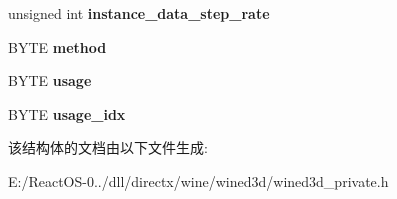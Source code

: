 \begin{DoxyCompactItemize}
unsigned int {\bfseries instance\+\_\+data\+\_\+step\+\_\+rate}
\item 
\mbox{\label{structwined3d__vertex__declaration__element_a0a8a48d1670300404e6c309ae764a777}} 
B\+Y\+TE {\bfseries method}
\item 
\mbox{\label{structwined3d__vertex__declaration__element_aae8bf7246029b3bbcef551bf24f8f53f}} 
B\+Y\+TE {\bfseries usage}
\item 
\mbox{\label{structwined3d__vertex__declaration__element_a119c19efb31f419a458d81baa621ec80}} 
B\+Y\+TE {\bfseries usage\+\_\+idx}
\end{DoxyCompactItemize}


该结构体的文档由以下文件生成\+:\begin{DoxyCompactItemize}
\item 
E\+:/\+React\+O\+S-\/0../dll/directx/wine/wined3d/wined3d\+\_\+private.\+h\end{DoxyCompactItemize}
